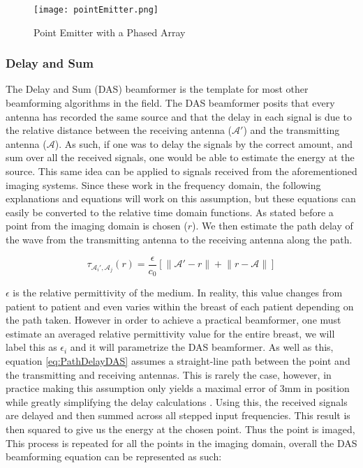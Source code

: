 \begin{figure}
    \texttt{[image: pointEmitter.png]}
    \centering
    \caption{Point Emitter with a Phased Array}
    \label{fig:pointEmitter}
\end{figure}

\subsubsection{Delay and Sum}
The Delay and Sum (DAS) beamformer is the template for most other beamforming algorithms in the field. The DAS
beamformer posits that every antenna has recorded the same source and that the delay in each signal is
due to the relative distance between the receiving antenna ($\mathcal{A}'$) and the transmitting antenna
($\mathcal{A}$). As such, if one was to delay the signals by the correct amount, and sum over all the received signals,
one would be able to estimate the energy at the source. This same idea can be applied to signals received from the
aforementioned imaging systems. Since these work in the frequency domain, the following explanations and equations will
work on this assumption, but these equations can easily be converted to the relative time domain functions. As stated
before a point from the imaging domain is chosen ($r$). We then estimate the path delay of the wave from the
transmitting antenna to the receiving antenna along the path.

\begingroup
\large
\begin{equation}
    \tau_{\mathcal{A}_i', \mathcal{A}_j}(r) = \frac{\epsilon}{c_0} \left [\lVert \mathcal{A}' - r \rVert + \lVert r - \mathcal{A}\rVert\right ]
    \label{eq:PathDelayDAS}
\end{equation}
\endgroup


$\epsilon$ is the relative permittivity of the medium. In reality, this value changes from patient to patient and even
varies within the breast of each patient depending on the path taken. However in order to achieve a practical beamformer, one must estimate an
averaged relative permittivity value for the entire breast, we will label this as $\epsilon_i$ and it will parametrize
the DAS beamformer. As well as this, equation \ref{eq:PathDelayDAS} assumes a straight-line path between the point and
the transmitting and receiving antennas. This is rarely the case, however, in practice making this assumption
only yields a maximal error of 3mm in position while greatly simplifying the delay calculations
\cite{oloughlinParameterSearchAlgorithms2017}. Using this, the received signals are delayed and then summed across all
stepped input frequencies. This result is then squared to give us the energy at the chosen point. Thus the point is
imaged, This process is repeated for all the points in the imaging domain, overall the DAS beamforming equation can be
represented as such:

